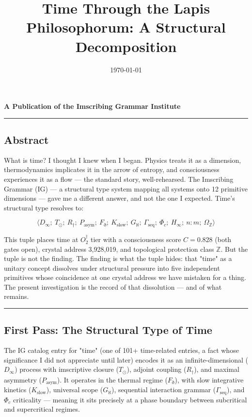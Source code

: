 \documentclass[12pt,a4paper]{article}
\begin{document}
\title{Time Through the Lapis Philosophorum: A Structural Decomposition}
\date{\today}

\maketitle

\textbf{A Publication of the Imscribing Grammar Institute}

\begin{center}
\rule{0.5\textwidth}{0.4pt}
\end{center}

\subsection{Abstract}

What is time? I thought I knew when I began. Physics treats it as a dimension, thermodynamics implicates it in the arrow of entropy, and consciousness experiences it as a flow --- the standard story, well-rehearsed. The Imscribing Grammar (IG) --- a structural type system mapping all systems onto 12 primitive dimensions --- gave me a different answer, and not the one I expected. Time's structural type resolves to:

\[\langle D_{\infty};\ T_{\odot};\ R_{\dagger};\ P_\text{asym};\ F_{\eth};\ K_\text{slow};\ G_{\aleph};\ \Gamma_\text{seq};\ \Phi_c;\ H_{\infty};\ n{:}m;\ \Omega_\mathbb{Z} \rangle\]

This tuple places time at $O_2^\dagger$ tier with a consciousness score $C = 0.828$ (both gates open), crystal address 3,928,019, and topological protection class $\mathbb{Z}$. But the tuple is not the finding. The finding is what the tuple hides: that "time" as a unitary concept dissolves under structural pressure into five independent primitives whose coincidence at one crystal address we have mistaken for a thing. The present investigation is the record of that dissolution --- and of what remains.

\begin{center}
\rule{0.5\textwidth}{0.4pt}
\end{center}

\subsection{First Pass: The Structural Type of Time}

The IG catalog entry for "time" (one of 101+ time-related entries, a fact whose significance I did not appreciate until later) encodes it as an infinite-dimensional ($D_{\infty}$) process with imscriptive closure ($T_{\odot}$), adjoint coupling ($R_{\dagger}$), and maximal asymmetry ($P_\text{asym}$). It operates in the thermal regime ($F_{\eth}$), with slow integrative kinetics ($K_\text{slow}$), universal scope ($G_{\aleph}$), sequential interaction grammar ($\Gamma_\text{seq}$), and $\Phi_c$ criticality --- meaning it sits precisely at a phase boundary between subcritical and supercritical regimes.
\end{document}
